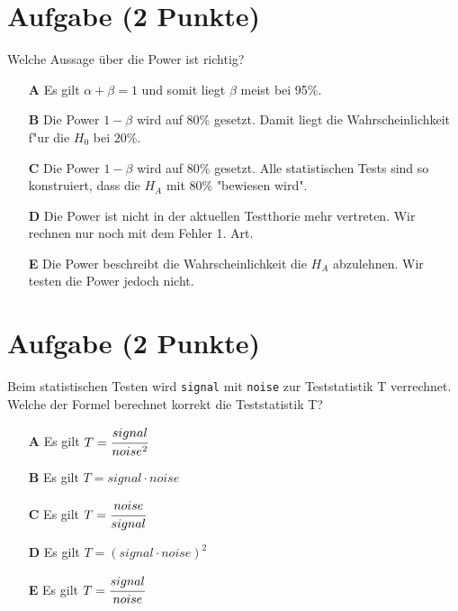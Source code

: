 \documentclass[a4paper, 10pt]{scrartcl}\usepackage[]{graphicx}\usepackage[]{xcolor}
\begin{document}
\section{Aufgabe \hfill (2 Punkte)}

Welche Aussage {\"u}ber die Power ist richtig?



\begin{enumerate}
\item [\textbf{A} \msquare] Es gilt $\alpha + \beta = 1$ und somit liegt $\beta$ meist bei 95\%.
\item [\textbf{B} \msquare] Die Power $1-\beta$ wird auf 80\% gesetzt. Damit liegt die Wahrscheinlichkeit f{"u}r die $H_0$ bei 20\%.
\item [\textbf{C} \msquare] Die Power $1-\beta$ wird auf 80\% gesetzt. Alle statistischen Tests sind so konstruiert, dass die $H_A$ mit 80\% "bewiesen wird".
\item [\textbf{D} \msquare] Die Power ist nicht in der aktuellen Testthorie mehr vertreten. Wir rechnen nur noch mit dem Fehler 1. Art.
\item [\textbf{E} \msquare] Die Power beschreibt die Wahrscheinlichkeit die $H_A$ abzulehnen. Wir testen die Power jedoch nicht.
\end{enumerate}

\section{Aufgabe \hfill (2 Punkte)}

Beim statistischen Testen wird \texttt{signal} mit \texttt{noise} zur
Teststatistik T verrechnet. Welche der Formel berechnet korrekt die
Teststatistik T?



\begin{enumerate}
\item [\textbf{A} \msquare] Es gilt $T = \cfrac{signal}{noise^2}$
\item [\textbf{B} \msquare] Es gilt $T = signal \cdot noise$
\item [\textbf{C} \msquare] Es gilt $T = \cfrac{noise}{signal}$
\item [\textbf{D} \msquare] Es gilt $T = (signal \cdot noise)^2$
\item [\textbf{E} \msquare] Es gilt $T = \cfrac{signal}{noise}$
\end{enumerate}

\end{document}
